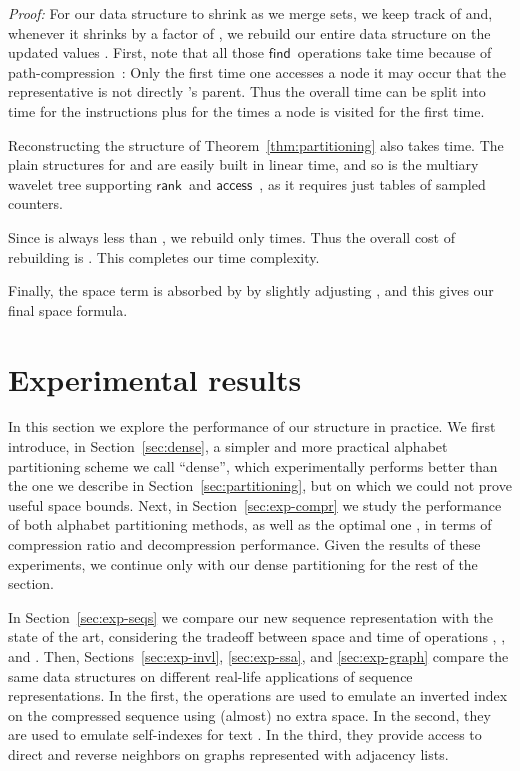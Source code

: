 \documentclass[11pt]{article}
\newenvironment{proof}{\textit{Proof:}}{\hfill \paragraph{} }
\newcommand{\access}
    {\ensuremath{\mathsf{access}}}
\newcommand{\rank}
    {\ensuremath{\mathsf{rank}}}
\newcommand{\find}
    {\ensuremath{\mathsf{find}}}
\begin{document}
\begin{table}[t]
{\begin{tabular}
\begin{proof}
For our data structure to shrink as we merge sets, we keep
track of  and, whenever it shrinks by a factor of , we rebuild our entire data structure on the updated values
. First, note that all those \find\ operations
take  time because of path-compression~\cite{TvL84}: Only the first
time one accesses a node  it may occur that the representative is not
directly 's parent. Thus the overall time can be split into  time
for the  instructions  plus  for the  times a node
 is visited for the first time.

Reconstructing the structure of Theorem~\ref{thm:partitioning} also takes 
 time. The plain structures for  and  are easily
built in linear time, and so is the multiary wavelet tree supporting \rank\ and
\access~\cite{FMMN07}, as it requires just tables of sampled counters.

Since  is always less than , we rebuild only 
 times. Thus the
overall cost of rebuilding is . This completes
our time complexity.

Finally, the space term  is
absorbed by  by slightly adjusting , and
this gives our final space formula.
\end{proof}

\section{Experimental results}
\label{sec:exper}

In this section we explore the performance of our structure in practice. We 
first introduce, in Section~\ref{sec:dense}, a simpler and more practical 
alphabet partitioning scheme we call ``dense'', which experimentally performs 
better than the 
one we describe in Section~\ref{sec:partitioning}, but on which we could not 
prove useful space bounds. Next, in Section~\ref{sec:exp-compr} we study the 
performance of both alphabet partitioning methods, as well as the optimal one 
\cite{Sai05}, in terms of compression ratio and decompression performance. 
Given the results of these experiments, we continue only with our dense
partitioning for the rest of the section.

In Section~\ref{sec:exp-seqs} we compare our new sequence representation
with the state of the art, considering the tradeoff between space and time
of operations , , and . Then,
Sections~\ref{sec:exp-invl}, \ref{sec:exp-ssa}, and \ref{sec:exp-graph} 
compare the same data structures on different real-life applications of 
sequence representations. In the first, the operations are used to emulate an
inverted index on the compressed sequence using (almost) no
extra space. In the second, they are used to emulate self-indexes for text
\cite{NM07}. In the third, they provide access to direct and reverse neighbors 
on graphs represented with adjacency lists.


\end{tabular}}
\end{table}
\end{document}
